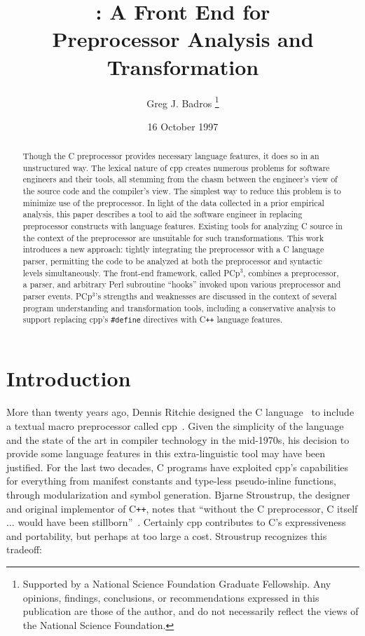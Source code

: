 \documentclass{article}
\title{\pcp{}: A \C{} Front End for \\ Preprocessor Analysis and Transformation}
\author{Greg J. Badros%
  \thanks{\tiny Supported by a National Science Foundation
    Graduate Fellowship. Any opinions, findings, conclusions, or
    recommendations expressed in this publication are those of the
    author, and do not necessarily reflect the views of the National
    Science Foundation.}
  \\  \email{gjb@cs.washington.edu}}
\date{16 October 1997}
\newcommand{\pcp}{\mbox{\textsf{PCp}$^3$}}
\newcommand{\Cpp}{\mbox{\textsf{cpp}}}
\newcommand{\CPP}{\mbox{C\texttt{++}}}
\newcommand{\Perl}{\mbox{Perl}}
\newcommand{\C}{\mbox{C}}
\newcommand{\ppd}[1]{\texttt{\##1}}
\begin{document}
\maketitle

\begin{abstract}
\label{sec:abstract}
Though the \C{} preprocessor provides necessary language features, it
does so in an unstructured way.  The lexical nature of \Cpp{} creates
numerous problems for software engineers and their tools, all stemming
from the chasm between the engineer's view of the source code and the
compiler's view.  The simplest way to reduce this problem is to minimize
use of the preprocessor.  In light of the data collected in a prior
empirical analysis, this paper describes a tool to aid the software
engineer in replacing preprocessor constructs with language features.
Existing tools for analyzing \C{} source in the context of the
preprocessor are unsuitable for such transformations. This work
introduces a new approach: tightly integrating the preprocessor with a
\C{} language parser, permitting the code to be analyzed at both the
preprocessor and syntactic levels simultaneously.  The front-end
framework, called \pcp{}, combines a preprocessor, a parser, and
arbitrary \Perl{} subroutine ``hooks'' invoked upon various preprocessor
and parser events.  \pcp{}'s strengths and weaknesses are discussed in
the context of several program understanding and transformation tools,
including a conservative analysis to support replacing \Cpp{}'s
\ppd{define} directives with \CPP{} language features.

\end{abstract}
\bigskip

\section{Introduction}
\label{sec:intro}
More than twenty years ago, Dennis Ritchie designed the \C{}
language~\cite{Kernighan88} to include a textual macro preprocessor
called \Cpp{}~\cite[Ch.~3]{Harbison91}.  Given the simplicity of the
language and the state of the art in compiler technology in the
mid-1970s, his decision to provide some language features in this
extra-linguistic tool may have been justified.  For the last two
decades, \C{} programs have exploited \Cpp{}'s capabilities for
everything from manifest constants and type-less pseudo-inline
functions, through modularization and symbol generation.  Bjarne
Stroustrup, the designer and original implementor of \CPP{}, notes that
``without the \C{} preprocessor, \C{} itself $\ldots$ would have been
stillborn''~\cite[p.~119]{Stroustrup94}.  Certainly \Cpp{}
contributes to \C{}'s expressiveness and portability, but
perhaps at too large a cost.  Stroustrup recognizes this tradeoff:
\end{document}
